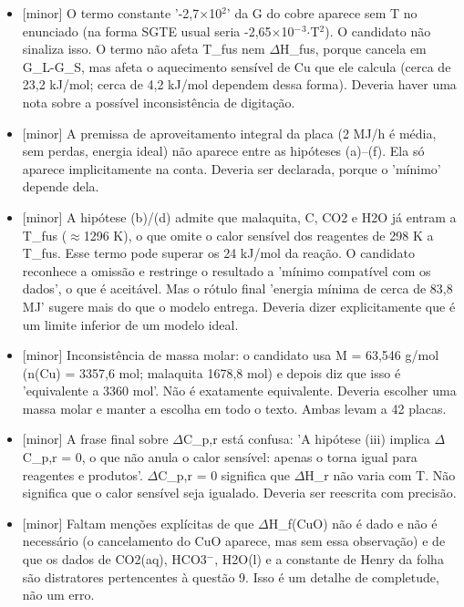 \documentclass{article}%
\begin{document}
\begin{itemize}%
\item%
{[}minor{]} O termo constante '-2,7$\times$10$^2$' da G do cobre aparece sem T no enunciado (na forma SGTE usual seria -2,65$\times$10$^{-}$$^3$$\cdot$T$^2$). O candidato não sinaliza isso. O termo não afeta T\_fus nem $\Delta$H\_fus, porque cancela em G\_L-G\_S, mas afeta o aquecimento sensível de Cu que ele calcula (cerca de 23,2 kJ/mol; cerca de 4,2 kJ/mol dependem dessa forma). Deveria haver uma nota sobre a possível inconsistência de digitação.%
\item%
{[}minor{]} A premissa de aproveitamento integral da placa (2 MJ/h é média, sem perdas, energia ideal) não aparece entre as hipóteses (a)--(f). Ela só aparece implicitamente na conta. Deveria ser declarada, porque o 'mínimo' depende dela.%
\item%
{[}minor{]} A hipótese (b)/(d) admite que malaquita, C, CO2 e H2O já entram a T\_fus ($\approx$1296 K), o que omite o calor sensível dos reagentes de 298 K a T\_fus. Esse termo pode superar os 24 kJ/mol da reação. O candidato reconhece a omissão e restringe o resultado a 'mínimo compatível com os dados', o que é aceitável. Mas o rótulo final 'energia mínima de cerca de 83,8 MJ' sugere mais do que o modelo entrega. Deveria dizer explicitamente que é um limite inferior de um modelo ideal.%
\item%
{[}minor{]} Inconsistência de massa molar: o candidato usa M = 63,546 g/mol (n(Cu) = 3357,6 mol; malaquita 1678,8 mol) e depois diz que isso é 'equivalente a 3360 mol'. Não é exatamente equivalente. Deveria escolher uma massa molar e manter a escolha em todo o texto. Ambas levam a 42 placas.%
\item%
{[}minor{]} A frase final sobre $\Delta$C\_p,r está confusa: 'A hipótese (iii) implica $\Delta$C\_p,r = 0, o que não anula o calor sensível: apenas o torna igual para reagentes e produtos'. $\Delta$C\_p,r = 0 significa que $\Delta$H\_r não varia com T. Não significa que o calor sensível seja igualado. Deveria ser reescrita com precisão.%
\item%
{[}minor{]} Faltam menções explícitas de que $\Delta$H\_f(CuO) não é dado e não é necessário (o cancelamento do CuO aparece, mas sem essa observação) e de que os dados de CO2(aq), HCO3$^{-}$, H2O(l) e a constante de Henry da folha são distratores pertencentes à questão 9. Isso é um detalhe de completude, não um erro.%
\end{itemize}%
\end{document}
